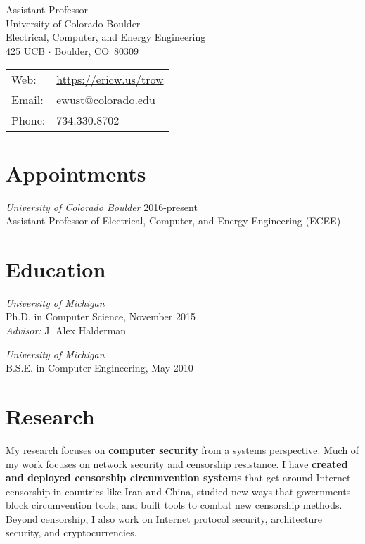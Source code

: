 \documentclass[margin,11pt]{res} %
\begin{document}
\begin{adjustwidth}{-1.3in}{0pt}
\vspace{20pt}

\noindent 
\parbox[m]{4in}{
Assistant Professor \\
University of Colorado Boulder\\
Electrical, Computer, and Energy Engineering\\
425 UCB $\cdot$ Boulder, CO \,80309
}
\begin{tabular}{ll}
{Web}:&\url{https://ericw.us/trow}\\
{Email}:&ewust@colorado.edu\\
{Phone}:& 734.330.8702
\end{tabular}
\vspace{10pt}
\end{adjustwidth}

\section{\large Appointments}

        \emph{University of Colorado Boulder} 2016-present\\
        Assistant Professor of Electrical, Computer, and Energy Engineering (ECEE)

\section{\large Education}

        \emph{University of Michigan}\\
        Ph.D. in Computer Science, November 2015\\
        \emph{Advisor:} J. Alex Halderman

        \emph{University of Michigan}\\
        B.S.E. in Computer Engineering, May 2010

\vspace{6pt}
\section{\large Research}

My research focuses on \textbf{computer security} from a systems perspective.
Much of my work focuses on network security and censorship resistance.
I have \textbf{created and deployed censorship circumvention systems} that get around Internet
censorship in countries like Iran and China, studied new ways that governments
block circumvention tools, and built tools to combat new censorship methods.
Beyond censorship, I also work on Internet protocol security, architecture security, and cryptocurrencies.
\end{document}
